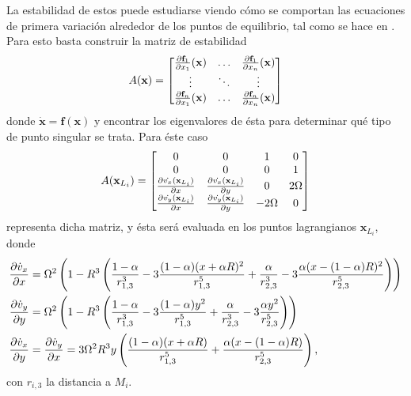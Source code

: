 La estabilidad de estos puede estudiarse viendo cómo se comportan las ecuaciones de primera variación alrededor de los puntos de equilibrio, tal como se hace en \cite{WMAP}. Para esto basta construir la matriz de estabilidad 
\begin{equation*}
 A(\mathbf{x}) = \begin{bmatrix}
  \frac{\partial \mathbf{f}_1}{\partial x_1}(\mathbf{x}) & \dots & \frac{\partial \mathbf{f}_1}{\partial x_n}(\mathbf{x}) \\
  \vdots & \ddots & \vdots \\ 
  \frac{\partial \mathbf{f}_n}{\partial x_1}(\mathbf{x}) & \dots & \frac{\partial \mathbf{f}_n}{\partial x_n} (\mathbf{x})
\end{bmatrix}
\end{equation*}
donde $\dot{\mathbf{x}} = \mathbf{f}(\mathbf{x})$ y encontrar los eigenvalores de ésta para determinar qué tipo de punto singular se trata. Para éste caso
\begin{equation}
 A(\mathbf{x}_{L_i}) = \begin{bmatrix}
  0 & 0 & 1 & 0 \\
  0 & 0 & 0 & 1 \\ 
  \frac{\partial \dot{v_x}(\mathbf{x}_{L_i})}{\partial x} & \frac{\partial \dot{v_x}(\mathbf{x}_{L_i})}{\partial y} & 0 & 2 \Omega \\
  \frac{\partial \dot{v_y}(\mathbf{x}_{L_i})}{\partial x} & \frac{\partial \dot{v_y}(\mathbf{x}_{L_i})}{\partial y} & -2\Omega & 0
\end{bmatrix}
\end{equation}
representa dicha matriz, y ésta será evaluada en los puntos lagrangianos $\mathbf{x}_{L_i}$, donde 
\begin{align}
 \frac{\partial \dot{v}_x}{\partial x} &= \Omega^2 \left( 1 - R^3 \left( \frac{1-\alpha}{r_{1,3}^3} - 3\frac{(1-\alpha)(x + \alpha R)^2}{r_{1,3}^5} + \frac{\alpha}{r_{2,3}^3} - 3\frac{\alpha(x - (1-\alpha) R)^2}{r_{2,3}^5} \right) \right) \nonumber \\ 
 \frac{\partial \dot{v}_y}{\partial y} &= \Omega^2 \left( 1 - R^3 \left( \frac{1-\alpha}{r_{1,3}^3} - 3\frac{(1-\alpha)y^2}{r_{1,3}^5} + \frac{\alpha}{r_{2,3}^3} - 3\frac{\alpha y^2}{r_{2,3}^5} \right) \right) \nonumber \\
 \frac{\partial \dot{v}_x}{\partial y} &= \frac{\partial \dot{v}_y}{\partial x} = 3 \Omega^2 R^3 y \left( \frac{(1-\alpha )(x+\alpha R)}{r_{1,3}^5} + \frac{\alpha (x- (1-\alpha )R)}{r_{2,3}^5} \right),
 \label{eq:3body_stability}
\end{align}
con $r_{i,3}$ la distancia a $M_i$.

